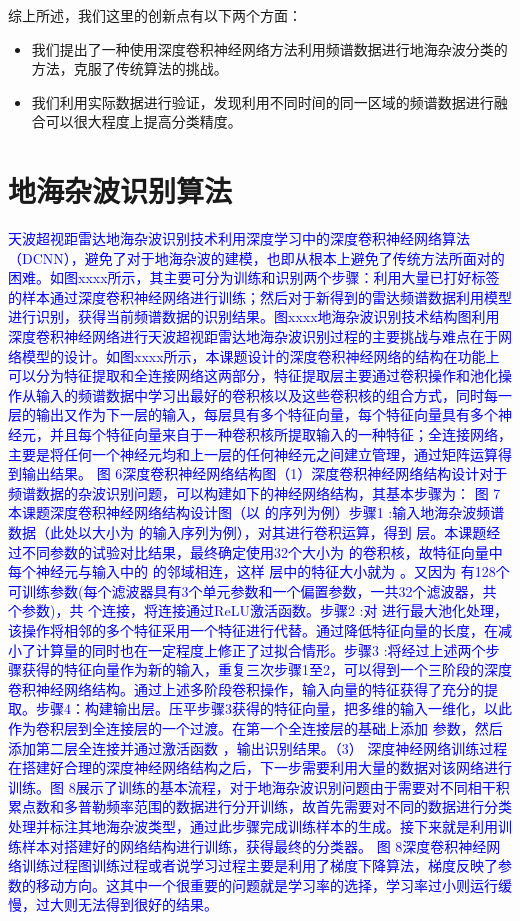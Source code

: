 综上所述，我们这里的创新点有以下两个方面：
\begin{itemize}
	\item 我们提出了一种使用深度卷积神经网络方法利用频谱数据进行地海杂波分类的方法，克服了传统算法的挑战。
	\item 我们利用实际数据进行验证，发现利用不同时间的同一区域的频谱数据进行融合可以很大程度上提高分类精度。
\end{itemize}

\section{地海杂波识别算法}
\textcolor{blue}{天波超视距雷达地海杂波识别技术利用深度学习中的深度卷积神经网络算法（DCNN），避免了对于地海杂波的建模，也即从根本上避免了传统方法所面对的困难。如图xxxx所示，其主要可分为训练和识别两个步骤：利用大量已打好标签的样本通过深度卷积神经网络进行训练；然后对于新得到的雷达频谱数据利用模型进行识别，获得当前频谱数据的识别结果。图xxxx地海杂波识别技术结构图利用深度卷积神经网络进行天波超视距雷达地海杂波识别过程的主要挑战与难点在于网络模型的设计。如图xxxx所示，本课题设计的深度卷积神经网络的结构在功能上可以分为特征提取和全连接网络这两部分，特征提取层主要通过卷积操作和池化操作从输入的频谱数据中学习出最好的卷积核以及这些卷积核的组合方式，同时每一层的输出又作为下一层的输入，每层具有多个特征向量，每个特征向量具有多个神经元，并且每个特征向量来自于一种卷积核所提取输入的一种特征；全连接网络，主要是将任何一个神经元均和上一层的任何神经元之间建立管理，通过矩阵运算得到输出结果。 图 6深度卷积神经网络结构图（1）深度卷积神经网络结构设计对于频谱数据的杂波识别问题，可以构建如下的神经网络结构，其基本步骤为： 图 7本课题深度卷积神经网络结构设计图（以 的序列为例）步骤1 :输入地海杂波频谱数据（此处以大小为 的输入序列为例），对其进行卷积运算，得到 层。本课题经过不同参数的试验对比结果，最终确定使用32个大小为 的卷积核，故特征向量中每个神经元与输入中的 的邻域相连，这样 层中的特征大小就为 。又因为 有128个可训练参数(每个滤波器具有3个单元参数和一个偏置参数，一共32个滤波器，共 个参数)，共 个连接，将连接通过ReLU激活函数。步骤2 :对 进行最大池化处理，该操作将相邻的多个特征采用一个特征进行代替。通过降低特征向量的长度，在减小了计算量的同时也在一定程度上修正了过拟合情形。步骤3 :将经过上述两个步骤获得的特征向量作为新的输入，重复三次步骤1至2，可以得到一个三阶段的深度卷积神经网络结构。通过上述多阶段卷积操作，输入向量的特征获得了充分的提取。步骤4：构建输出层。压平步骤3获得的特征向量，把多维的输入一维化，以此作为卷积层到全连接层的一个过渡。在第一个全连接层的基础上添加 参数，然后添加第二层全连接并通过激活函数 ，输出识别结果。（3）	深度神经网络训练过程在搭建好合理的深度神经网络结构之后，下一步需要利用大量的数据对该网络进行训练。图 8展示了训练的基本流程，对于地海杂波识别问题由于需要对不同相干积累点数和多普勒频率范围的数据进行分开训练，故首先需要对不同的数据进行分类处理并标注其地海杂波类型，通过此步骤完成训练样本的生成。接下来就是利用训练样本对搭建好的网络结构进行训练，获得最终的分类器。 图 8深度卷积神经网络训练过程图训练过程或者说学习过程主要是利用了梯度下降算法，梯度反映了参数的移动方向。这其中一个很重要的问题就是学习率的选择，学习率过小则运行缓慢，过大则无法得到很好的结果。}

